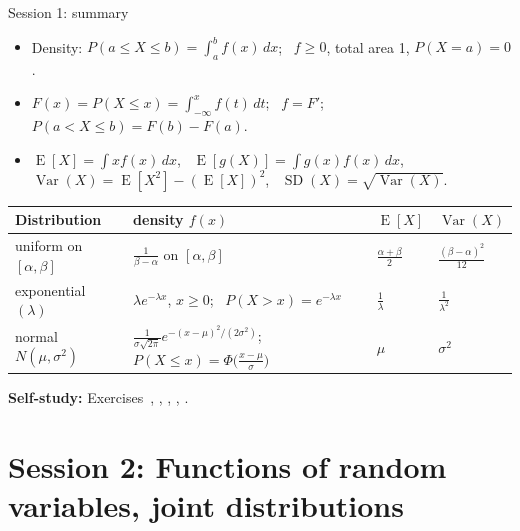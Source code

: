 \documentclass[aspectratio=169,11pt,usepdftitle=false]{beamer}
\newcommand{\E}{\operatorname{E}}
\newcommand{\Var}{\operatorname{Var}}
\newcommand{\SD}{\operatorname{SD}}
\begin{document}

\begin{frame}{Session 1: summary}
  \small
  \begin{itemize}
    \item Density: $P(a\le X\le b)=\int_a^b f(x)\,dx$; \ $f\ge0$, total
          area 1, $P(X=a)=0$.
    \item $F(x)=P(X\le x)=\int_{-\infty}^x f(t)\,dt$; \ $f=F'$; \
          $P(a<X\le b)=F(b)-F(a)$.
    \item $\E[X]=\int x f(x)\,dx$, \ $\E[g(X)]=\int g(x)f(x)\,dx$, \
          $\Var(X)=\E[X^2]-(\E[X])^2$, \ $\SD(X)=\sqrt{\Var(X)}$.
  \end{itemize}
  \vspace{1mm}
  \centering
  \renewcommand{\arraystretch}{1.25}
  \begin{tabular}{@{}llll@{}}
    \toprule
    Distribution & density $f(x)$ & $\E[X]$ & $\Var(X)$\\\midrule
    uniform on $[\alpha,\beta]$ & $\frac{1}{\beta-\alpha}$ on
    $[\alpha,\beta]$ & $\frac{\alpha+\beta}{2}$ &
    $\frac{(\beta-\alpha)^2}{12}$\\
    exponential $(\lambda)$ & $\lambda e^{-\lambda x}$, $x\ge0$; \
    $P(X>x)=e^{-\lambda x}$ & $\frac1\lambda$ & $\frac1{\lambda^2}$\\
    normal $N(\mu,\sigma^2)$ & $\frac{1}{\sigma\sqrt{2\pi}}
    e^{-(x-\mu)^2/(2\sigma^2)}$; \
    $P(X\le x)=\Phi\big(\frac{x-\mu}{\sigma}\big)$ & $\mu$ &
    $\sigma^2$\\\bottomrule
  \end{tabular}
  \vspace{1.5mm}

  \raggedright
  \textbf{Self-study:} Exercises~,
  , ,
  , .
\end{frame}

\section{Session 2: Functions of random variables, joint distributions}
\end{document}
